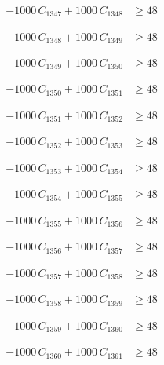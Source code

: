 \documentclass[a4paper,11pt]{article}
\begin{document}
\begin{align}
-1000\,C_{1347} + 1000\,C_{1348} &\geq 48 \nonumber
\end{align}

\begin{align}
-1000\,C_{1348} + 1000\,C_{1349} &\geq 48 \nonumber
\end{align}

\begin{align}
-1000\,C_{1349} + 1000\,C_{1350} &\geq 48 \nonumber
\end{align}

\begin{align}
-1000\,C_{1350} + 1000\,C_{1351} &\geq 48 \nonumber
\end{align}

\begin{align}
-1000\,C_{1351} + 1000\,C_{1352} &\geq 48 \nonumber
\end{align}

\begin{align}
-1000\,C_{1352} + 1000\,C_{1353} &\geq 48 \nonumber
\end{align}

\begin{align}
-1000\,C_{1353} + 1000\,C_{1354} &\geq 48 \nonumber
\end{align}

\begin{align}
-1000\,C_{1354} + 1000\,C_{1355} &\geq 48 \nonumber
\end{align}

\begin{align}
-1000\,C_{1355} + 1000\,C_{1356} &\geq 48 \nonumber
\end{align}

\begin{align}
-1000\,C_{1356} + 1000\,C_{1357} &\geq 48 \nonumber
\end{align}

\begin{align}
-1000\,C_{1357} + 1000\,C_{1358} &\geq 48 \nonumber
\end{align}

\begin{align}
-1000\,C_{1358} + 1000\,C_{1359} &\geq 48 \nonumber
\end{align}

\begin{align}
-1000\,C_{1359} + 1000\,C_{1360} &\geq 48 \nonumber
\end{align}

\begin{align}
-1000\,C_{1360} + 1000\,C_{1361} &\geq 48 \nonumber
\end{align}
\end{document}
